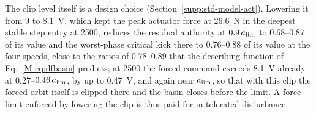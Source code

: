 The clip level itself is a design choice (Section~\ref{supp:std-model-act}). Lowering it from 9 to \SI{8.1}{\volt}, which kept the peak actuator force at \SI{26.6}{\newton} in the deepest stable step entry at \SI{2500}{\rpm}, reduces the residual authority at $0.9\,a_{\lim}$ to 0.68--0.87 of its value and the worst-phase critical kick there to 0.76--0.88 of its value at the four speeds, close to the ratios of 0.78--0.89 that the describing function of Eq.~\eqref{M-eq:dfbasin} predicts; at \SI{2500}{\rpm} the forced command exceeds \SI{8.1}{\volt} already at 0.27--$0.46\,a_{\lim}$, by up to \SI{0.47}{\volt}, and again near $a_{\lim}$, so that with this clip the forced orbit itself is clipped there and the basin closes before the limit. A force limit enforced by lowering the clip is thus paid for in tolerated disturbance.
